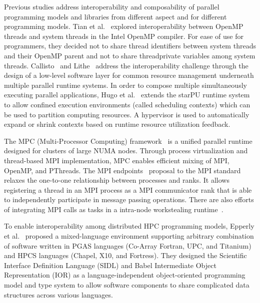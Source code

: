 Previous studies address interoperability and composability of parallel programming models and libraries 
from different aspect and for different programming models. 
Tian et al.~\cite{tian2003compiler} explored interoperability between OpenMP threads and system threads in the Intel OpenMP compiler.
For ease of use for programmers, they decided not to share thread identifiers between system threads and their OpenMP parent
and not to share {\sf threadprivate} variables among system threads.
Callisto~\cite{Callisto:Harris:2014:CCP:2592798.2592807} and
Lithe~\cite{Lithe:Pan:2009:LEE:1855591.1855602} 
address the interoperability challenge 
through the design of a low-level software layer for common 
resource management underneath multiple parallel runtime systems. %
In order to compose multiple simultaneously executing parallel applications, Hugo et al.~\cite{hugo2014composing} extends the starPU runtime system to allow confined execution environments (called scheduling contexts) which can be used to partition computing resources. 
A hypervisor is used to automatically expand or shrink contexts based on runtime resource utilization feedback. 

The MPC (Multi-Processor Computing) framework~\cite{perache2008mpc} is a unified parallel runtime designed for clusters of large NUMA nodes. 
Through process virtualization and thread-based MPI implementation, MPC enables efficient mixing of MPI, OpenMP, and PThreads. 
The MPI endpoints~\cite{Dinan:mpiendpoint_eurompi13}
proposal to the MPI standard relaxes the one-to-one relationship between processes and ranks.
It allows registering a thread in an MPI
process as a MPI communicator rank that is able to independently participate
in message passing operations. There are also efforts of integrating MPI calls as
tasks in a intra-node workstealing runtime~\cite{hcmpi:ipdps13}.

To enable interoperability among distributed HPC programming models, Epperly et al.~\cite{epperly2011composite} proposed a mixed-language environment supporting arbitrary combination of software written in PGAS languages (Co-Array Fortran, UPC, and Titanium) and HPCS languages (Chapel, X10, and Fortress). 
They designed the Scientific Interface Definition Language (SIDL) and Babel Intermediate Object Representation (IOR) as a language-independent object-oriented programming model and type system
to allow software components to share complicated data structures across various languages. 
